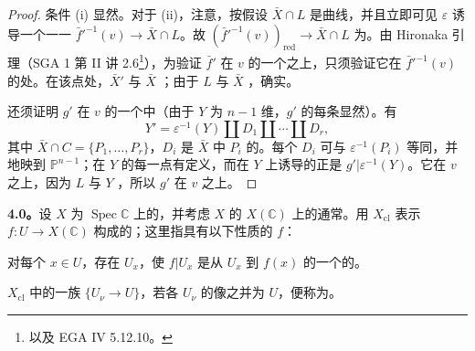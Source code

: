 \begin{proof}
条件 (i) 显然。对于 (ii)，注意，按假设 $\bar X\cap L$ 是曲线，并且立即可见 $\varepsilon$ 诱导一个一一 $\bar f'^{-1}(v)\to\bar X\cap L$。故 $(\bar f'^{-1}(v))_{\mathrm{red}}\to\bar X\cap L$ 为。由 Hironaka 引理（SGA 1 第 II 讲 2.6\footnote{以及 EGA IV 5.12.10。}），为验证 $\bar f'$ 在 $v$ 的一个之上，只须验证它在 $\bar f'^{-1}(v)$ 的处。在该点处，$\bar X'$ 与 $\bar X$ ；由于 $L$ 与 $\bar X$ ，确实。

还须证明 $g'$ 在 $v$ 的一个中（由于 $Y$ 为 $n-1$ 维，$g'$ 的每条显然）。有
\[
 Y'=\varepsilon^{-1}(Y)\amalg D_1\amalg\cdots\amalg D_r,
\]
其中 $\bar X\cap C=\{P_1,\ldots,P_r\}$，$D_i$ 是 $\bar X$ 中 $P_i$ 的。每个 $D_i$ 可与 $\varepsilon^{-1}(P_i)$ 等同，并地映到 $\mathbb P^{n-1}$；在 $Y$ 的每一点有定义，而在 $Y$ 上诱导的正是 $g'|\varepsilon^{-1}(Y)$。它在 $v$ 之上，因为 $L$ 与 $Y$ ，所以 $g'$ 在 $v$ 之上。
\end{proof}

\textbf{4.0。}设 $X$ 为 $\operatorname{Spec}\mathbb C$ 上的，并考虑 $X$ 的 $X(\mathbb C)$ 上的通常。用 $X_{\mathrm{cl}}$ 表示 $f:U\to X(\mathbb C)$ 构成的；这里指具有以下性质的 $f$：

对每个 $x\in U$，存在 $U_x$，使 $f|U_x$ 是从 $U_x$ 到 $f(x)$ 的一个的。

$X_{\mathrm{cl}}$ 中的一族 $\{U_\nu\to U\}$，若各 $U_\nu$ 的像之并为 $U$，便称为。

